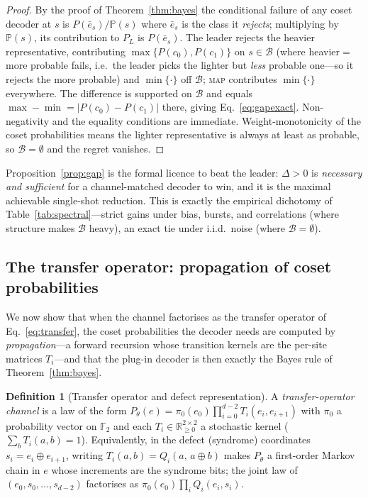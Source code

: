\documentclass[reprint,aps,prxquantum,amsmath,amssymb,floatfix,nofootinbib,longbibliography]{revtex4-2}
\theoremstyle{definition}
\newtheorem{definition}{Definition}
\theoremstyle{remark}
\theoremstyle{plain}
\newcommand{\R}{\mathbb{R}}
\newcommand{\F}{\mathbb{F}}
\newcommand{\PP}{\mathbb{P}}
\newcommand{\calB}{\mathcal{B}}
\begin{document}
\begin{proof}
By the proof of Theorem~\ref{thm:bayes} the conditional failure of any coset
decoder at $s$ is $P(\bar e_s)/\PP(s)$ where $\bar e_s$ is the class it
\emph{rejects}; multiplying by $\PP(s)$, its contribution to $P_L$ is
$P(\bar e_s)$. The leader rejects the heavier representative, contributing
$\max\{P(c_0),P(c_1)\}$ on $s\in\calB$ (where heavier${}={}$more probable
fails, i.e.\ the leader picks the lighter but \emph{less} probable one---so it
rejects the more probable) and $\min\{\cdot\}$ off $\calB$; \textsc{map}
contributes $\min\{\cdot\}$ everywhere. The difference is supported on $\calB$
and equals $\max-\min=|P(c_0)-P(c_1)|$ there, giving
Eq.~\eqref{eq:gapexact}. Non-negativity and the equality conditions are
immediate. Weight-monotonicity of the coset probabilities means the lighter
representative is always at least as probable, so $\calB=\emptyset$ and the
regret vanishes.
\end{proof}

Proposition~\ref{prop:gap} is the formal licence to beat the leader:
$\Delta>0$ is \emph{necessary and sufficient} for a channel-matched decoder to
win, and it is the maximal achievable single-shot reduction. This is exactly
the empirical dichotomy of Table~\ref{tab:spectral}---strict gains under bias,
bursts, and correlations (where structure makes $\calB$ heavy), an exact tie
under i.i.d.\ noise (where $\calB=\emptyset$).

\subsection{The transfer operator: propagation of coset probabilities}
\label{sec:bayes_transfer}

We now show that when the channel factorises as the transfer operator of
Eq.~\eqref{eq:transfer}, the coset probabilities the decoder needs are computed
by \emph{propagation}---a forward recursion whose transition kernels are the
per-site matrices $T_i$---and that the plug-in decoder is then exactly the
Bayes rule of Theorem~\ref{thm:bayes}.

\begin{definition}[Transfer operator and defect representation]
\label{def:transfer}
A \emph{transfer-operator channel} is a law of the form
$P_\theta(e)=\pi_0(e_0)\prod_{i=0}^{d-2}T_i(e_i,e_{i+1})$ with $\pi_0$ a
probability vector on $\F_2$ and each $T_i\in\R_{\ge0}^{2\times2}$ a stochastic
kernel ($\sum_b T_i(a,b)=1$). Equivalently, in the defect
(syndrome) coordinates $s_i=e_i\oplus e_{i+1}$, writing
$T_i(a,b)=Q_i(a,\,a\oplus b)$ makes $P_\theta$ a first-order Markov chain in $e$
whose increments are the syndrome bits; the joint law of $(e_0,s_0,\dots,s_{d-2})$
factorises as $\pi_0(e_0)\prod_i Q_i(e_i,s_i)$.
\end{definition}
\end{document}
